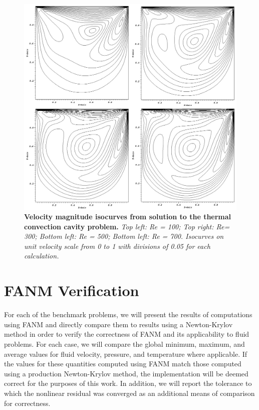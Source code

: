 \begin{figure}[t!]
  \begin{center}
    \includegraphics[width=6in]{chapters/nonlinear_problem/driven_velocity_isocurves.png}
  \end{center}
  \caption{\textbf{Velocity magnitude isocurves from solution to the
      thermal convection cavity problem.} \textit{Top left: Re = 100;
      Top right: Re= 300; Bottom left: Re = 500; Bottom left: Re =
      700. Isocurves on unit velocity scale from 0 to 1 with divisions
      of 0.05 for each calculation.}}
  \label{fig:driven_velocity_isocurves}
\end{figure}

\clearpage

\section{FANM Verification\ }
\label{sec:fanm_verification}

For each of the benchmark problems, we will present the results of
computations using FANM and directly compare them to results using a
Newton-Krylov method in order to verify the correctness of FANM and
its applicability to fluid problems. For each case, we will compare
the global minimum, maximum, and average values for fluid velocity,
pressure, and temperature where applicable. If the values for these
quantities computed using FANM match those computed using a production
Newton-Krylov method, the implementation will be deemed correct for
the purposes of this work. In addition, we will report the tolerance
to which the nonlinear residual was converged as an additional means
of comparison for correctness.


